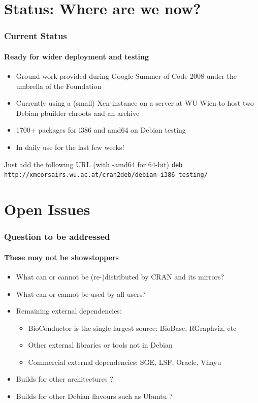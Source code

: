 \documentclass[smaller,compress]{beamer}
\begin{document}
\section[Status]{Status: Where are we now?}
\begin{frame}
  \frametitle{Current Status}
  \framesubtitle{Ready for wider deployment and testing}

  \begin{itemize}
  \item Ground-work provided during Google Summer of Code 2008 under the
    umbrella of the \R Foundation
  \item Currently using a (small) Xen-instance on a server at WU Wien to host
    two Debian pbuilder chroots and an archive
  \item 1700+ packages for i386 and amd64 on Debian testing
  \item In daily use for the last few weeks!
  \end{itemize}

  \MedSkip
  Just add the following URL (with -amd64 for 64-bit) \newline 
  { \SmallSkip \scriptsize
    \texttt{deb http://xmcorsairs.wu.ac.at/cran2deb/debian-i386 testing/}
  }

\end{frame}

\section{Open Issues}
\begin{frame}
  \frametitle{Question to be addressed}
  \framesubtitle{These may not be showstoppers}

  \begin{itemize}
  \item What can or cannot be (re-)distributed by CRAN and its mirrors?
  \item What can or cannot be used by all users?
  \item Remaining external dependencies: 
    \begin{itemize}
      \item BioConductor is the single largest source: BioBase, RGraphviz, etc
      \item Other external libraries or tools not in Debian 
      \item Commercial external dependencies: SGE, LSF, Oracle, Vhayu
    \end{itemize}
  \item Builds for other architectures ?
  \item Builds for other Debian flavours such as Ubuntu ?
  \end{itemize}
\end{frame}
\end{document}
